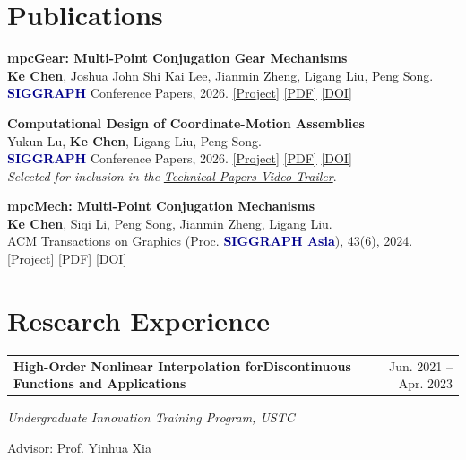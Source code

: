 \documentclass[a4paper,11pt]{article}
\makeatletter
\newcommand{\cvheading}[2]{%
  \begin{tabularx}{\linewidth}{@{}X@{\hspace{1em}}r@{}}
    \textbf{#1} & #2
  \end{tabularx}\par
}
\makeatother
\begin{document}
\section{Publications}
\begin{enumerate}[label={[\arabic*]},leftmargin=1.8em,labelsep=0.5em,
                  itemsep=6pt,topsep=0pt,parsep=0pt,partopsep=0pt]
  \item \textbf{mpcGear: Multi-Point Conjugation Gear Mechanisms}\\
    \textbf{Ke Chen}, Joshua John Shi Kai Lee, Jianmin Zheng, Ligang Liu, Peng Song.\\
    \textcolor{darkblue}{\textbf{SIGGRAPH}} Conference Papers, 2026.
    \href{https://sutd-cgl.github.io/supp/Publication/projects/2026-SIGGRAPH-mpcGear/index.html}{[Project]}
    \href{https://sutd-cgl.github.io/supp/Publication/papers/2026-SIGGRAPH-mpcGear.pdf}{[PDF]}
    \href{https://dl.acm.org/doi/10.1145/3799902.3811089}{[DOI]}

  \item \textbf{Computational Design of Coordinate-Motion Assemblies}\\
    Yukun Lu, \textbf{Ke Chen}, Ligang Liu, Peng Song.\\
    \textcolor{darkblue}{\textbf{SIGGRAPH}} Conference Papers, 2026.
    \href{https://sutd-cgl.github.io/supp/Publication/projects/2026-SIGGRAPH-CoordinateMotion/index.html}{[Project]}
    \href{https://sutd-cgl.github.io/supp/Publication/papers/2026-SIGGRAPH-CoordinateMotion.pdf}{[PDF]}
    \href{https://dl.acm.org/doi/10.1145/3799902.3811068}{[DOI]}\\
    \textit{Selected for inclusion in the}
    \href{https://www.youtube.com/watch?v=sIcGH3M5yPc}{\textit{Technical Papers Video Trailer}}.

  \item \textbf{mpcMech: Multi-Point Conjugation Mechanisms}\\
    \textbf{Ke Chen}, Siqi Li, Peng Song, Jianmin Zheng, Ligang Liu.\\
    ACM Transactions on Graphics (Proc. \textcolor{darkblue}{\textbf{SIGGRAPH Asia}}), 43(6), 2024.
    \href{https://sutd-cgl.github.io/supp/Publication/projects/2024-SIGAsia-mpcMech/index.html}{[Project]}
    \href{https://sutd-cgl.github.io/supp/Publication/projects/2024-SIGAsia-mpcMech/download/2024-SIGAsia-mpcMech.pdf}{[PDF]}
    \href{https://dl.acm.org/doi/10.1145/3687770}{[DOI]}
\end{enumerate}

\section{Research Experience}
\cvheading{High-Order Nonlinear Interpolation for\newline Discontinuous Functions and Applications}{Jun. 2021 -- Apr. 2023}
\textit{Undergraduate Innovation Training Program, USTC}\par
Advisor: Prof. Yinhua Xia
\end{document}
